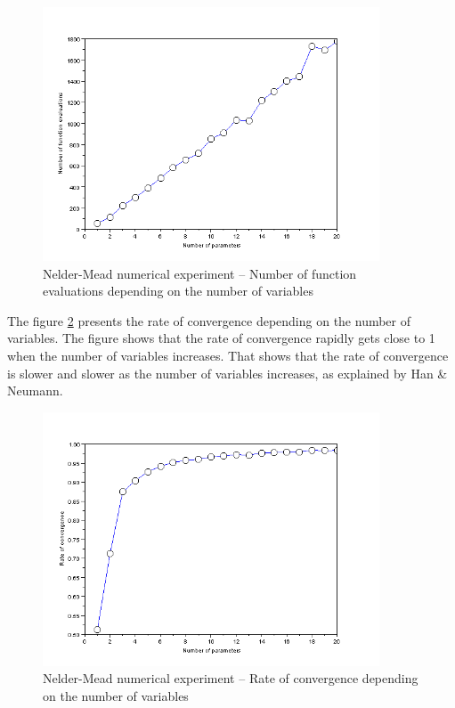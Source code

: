 \begin{figure}
\begin{center}
\includegraphics[width=10cm]{neldermead-dimension-nfevals.png}
\end{center}
\caption{Nelder-Mead numerical experiment -- Number of function evaluations 
depending on the number of variables}
\label{fig-nm-numexp3-fvn}
\end{figure}

The figure \ref{fig-nm-numexp3-rho} presents the rate of convergence 
depending on the number of variables. The figure shows that 
the rate of convergence rapidly gets close to 1 when the number 
of variables increases. That shows that the rate of convergence 
is slower and slower as the number of variables increases, as 
explained by Han \& Neumann.

\begin{figure}
\begin{center}
\includegraphics[width=10cm]{neldermead-dimension-rho.png}
\end{center}
\caption{Nelder-Mead numerical experiment -- Rate of convergence 
depending on the number of variables}
\label{fig-nm-numexp3-rho}
\end{figure}

